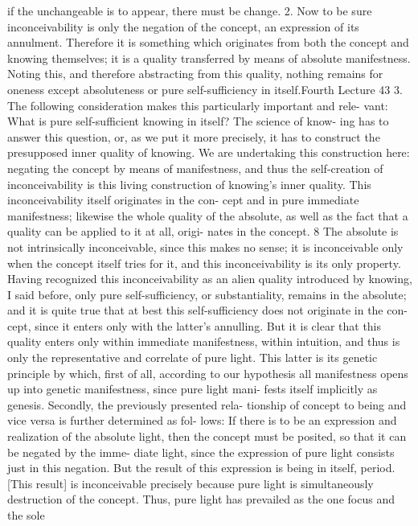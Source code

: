 if the unchangeable is to appear, there must be change.
2. Now to be sure inconceivability is only the negation of the concept, an
expression of its annulment. Therefore it is something which originates
from both the concept and knowing themselves; it is a quality transferred
by means of absolute manifestness. Noting this, and therefore abstracting
from this quality, nothing remains for oneness except absoluteness or pure
self-sufficiency in itself.Fourth Lecture
43
3. The following consideration makes this particularly important and rele-
vant: What is pure self-sufficient knowing in itself? The science of know-
ing has to answer this question, or, as we put it more precisely, it has to
construct the presupposed inner quality of knowing. We are undertaking
this construction here: negating the concept by means of manifestness,
and thus the self-creation of inconceivability is this living construction of
knowing’s inner quality. This inconceivability itself originates in the con-
cept and in pure immediate manifestness; likewise the whole quality of the
absolute, as well as the fact that a quality can be applied to it at all, origi-
nates in the concept. 8 The absolute is not intrinsically inconceivable, since
this makes no sense; it is inconceivable only when the concept itself tries
for it, and this inconceivability is its only property. Having recognized this
inconceivability as an alien quality introduced by knowing, I said before,
only pure self-sufficiency, or substantiality, remains in the absolute; and it
is quite true that at best this self-sufficiency does not originate in the con-
cept, since it enters only with the latter’s annulling. But it is clear that this
quality enters only within immediate manifestness, within intuition, and
thus is only the representative and correlate of pure light. This latter is its
genetic principle by which, first of all, according to our hypothesis all
manifestness opens up into genetic manifestness, since pure light mani-
fests itself implicitly as genesis. Secondly, the previously presented rela-
tionship of concept to being and vice versa is further determined as fol-
lows: If there is to be an expression and realization of the absolute light,
then the concept must be posited, so that it can be negated by the imme-
diate light, since the expression of pure light consists just in this negation.
But the result of this expression is being in itself, period. [This result] is
inconceivable precisely because pure light is simultaneously destruction of
the concept. Thus, pure light has prevailed as the one focus and the sole
